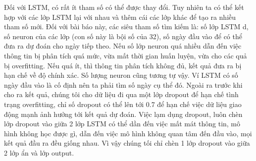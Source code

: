 Đối với LSTM, có rất ít tham số có thể được thay đổi. Tuy nhiên ta có thể kết hợp với các lớp LSTM lại với nhau và thêm cái các lớp khác để tạo ra nhiều tham số mới. Đối với bài báo này, các siêu tham số tìm kiếm là: số lớp LSTM d, số neuron của các lớp (con số này là bội số của 32), số ngày đầu vào để có thể đưa ra dự đoán cho ngày tiếp theo. Nếu số lớp neuron quá nhiều dẫn đến việc thông tin bị phân tích quá mức, vừa mất thời gian huấn luyện, vừa cho các quả bị overfitting. Nếu quá ít, thì thông tin phân tích không đủ, kết quả đưa ra bị hạn chế về độ chính xác. Số lượng neuron cũng tương tự vậy. Ví LSTM có số ngày đầu vào là cố định nên ta phải tìm số ngày cụ thể đó. Ngoài ra trước khi cho ra kết quả, chúng tôi cho dữ liệu đi qua một lớp dropout để hạn chế tình trạng overfitting, chỉ số dropout có thể lên tới 0.7 để hạn chế việc dữ liệu giao động mạnh ảnh hưởng tới kết quả dự đoán. Việc lạm dụng dropout, luôn chèn lớp dropout vào giữa 2 lớp LSTM có thể dần đến việc mất mát thông tin, mô hình không học được gì, dẫn đến việc mô hình không quan tâm đến đầu vào, mọi kết quả đầu ra đều giống nhau. Vì vậy chúng tối chỉ chèn 1 lớp dropout vào giữa 2 lớp ẩn và lớp output.